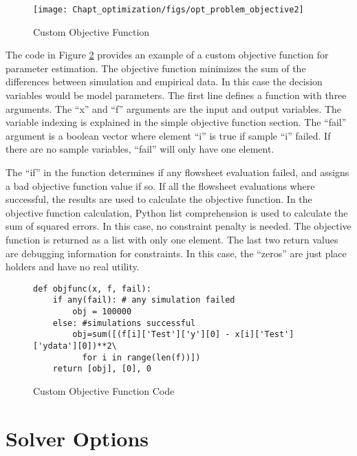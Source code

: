 \begin{figure}[H]
	\begin{center}
		\texttt{[image: Chapt\_optimization/figs/opt\_problem\_objective2]}
		\caption{Custom  Objective Function}
		\label{fig.opt.problem.objective2}
	\end{center}
\end{figure}

The code in Figure \ref{fig.opt.problem.objective2_code} provides an example of a custom objective function for parameter estimation. The objective function minimizes the sum of the differences between simulation and empirical data. In this case the decision variables would be model parameters. The first line defines a function with three arguments. The ``x'' and ``f'' arguments are the input and output variables. The variable indexing is explained in the simple objective function section.  The ``fail'' argument is a boolean vector where element ``i'' is true if sample ``i'' failed. If there are no sample variables, ``fail'' will only have one element.

The ``if'' in the function determines if any flowsheet evaluation failed, and assigns a bad objective function value if so. If all the flowsheet evaluations where successful, the results are used to calculate the objective function. In the objective function calculation, Python list comprehension is used to calculate the sum of squared errors. In this case, no constraint penalty is needed. The objective function is returned as a list with only one element. The last two return values are debugging information for constraints. In this case, the ``zeros'' are just place holders and have no real utility.

\begin{figure}[H]
\begin{small}
\begin{verbatim}
def objfunc(x, f, fail):
    if any(fail): # any simulation failed
        obj = 100000
    else: #simulations successful
        obj=sum([(f[i]['Test']['y'][0] - x[i]['Test']['ydata'][0])**2\
          for i in range(len(f))])
    return [obj], [0], 0
\end{verbatim}
\end{small}
\caption{Custom  Objective Function Code}
\label{fig.opt.problem.objective2_code}
\end{figure}

\section{Solver Options}\label{sec.opt.solver.options}

